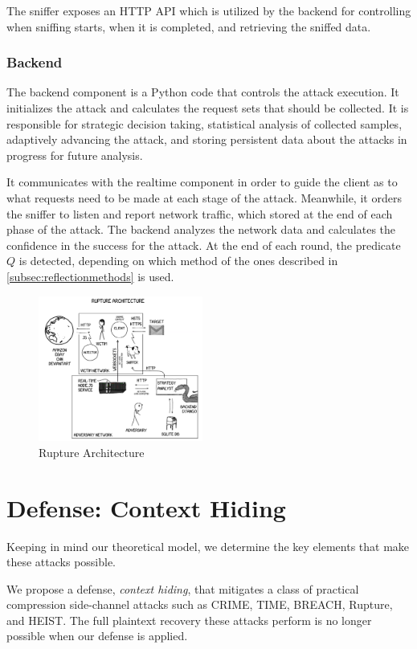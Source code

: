 \documentclass[conference, letterpaper, 10pt]{IEEEtran}
\begin{document}
The sniffer exposes an HTTP API which is utilized by the backend for controlling
when sniffing starts, when it is completed, and retrieving the sniffed data.

\subsubsection{Backend}

The backend component is a Python code that controls the attack execution. It
initializes the attack and calculates the request sets that should be
collected. It is responsible for strategic decision taking, statistical
analysis of collected samples, adaptively advancing the attack, and storing
persistent data about the attacks in progress for future analysis.

It communicates with the realtime component in order to guide the client as to
what requests need to be made at each stage of the attack. Meanwhile, it orders
the sniffer to listen and report network traffic, which stored
at the end of each phase of the attack. The backend analyzes the
network data and calculates the confidence in the success for the attack. At the
end of each round, the predicate $Q$ is detected, depending on which method of
the ones described
in \ref{subsec:reflectionmethods} is used.

   \begin{figure}[thpb]
      \centering
          \includegraphics[width=0.48\textwidth]{architecture.png}
      \caption{Rupture Architecture}
   \end{figure}

\section{Defense: Context Hiding}\label{sec:defense}
Keeping in mind our theoretical model, we determine the key elements that make these
attacks possible.

We propose a defense, \textit{context hiding}, that mitigates a class of
practical compression side-channel attacks such as CRIME, TIME, BREACH, Rupture,
and HEIST. The full plaintext recovery these attacks perform is no longer
possible when our defense is applied.
\end{document}
